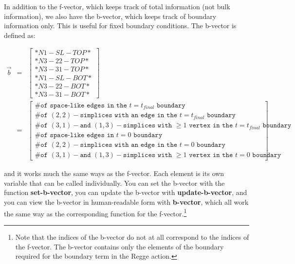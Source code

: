 \message{ !name(programmers_guide.tex)}\documentclass[12pt]{article}
\begin{document}
In addition to the f-vector, which keeps track of total information
(not bulk information), we also have the b-vector, which keeps track
of boundary information only. This is useful for fixed boundary
conditions. The b-vector is defined as:
\begin{small}
\begin{eqnarray}
  \vec{b}&=&\left[\begin{array}{c}\texttt{*}N1-SL-TOP*\\
      \texttt{*}N3-22-TOP*\\\texttt{*}N3-31-TOP*\\
      \texttt{*}N1-SL-BOT* \\\texttt{*}N3-22-BOT*\\ 
      \texttt{*}N3-31-BOT*\end{array}\right]\nonumber\\
  &=&\left[\begin{array}{c}\texttt{\# of space-like edges in the }t=t_{final}\texttt{ boundary}\\
      \texttt{\# of }(2,2)-\texttt{simplices with an edge in the }t=t_{final}\texttt{ boundary}\\
      \texttt{\# of }(3,1)-\texttt{and }(1,3)-\texttt{simplices with }\geq 1\texttt{ vertex in the }t=t_{final}\texttt{ boundary}\\
      \texttt{\# of space-like edges in } t=0\texttt{ boundary}\\
      \texttt{\# of }(2,2)-\texttt{simplices with an edge in the }t=0\texttt{ boundary}\\
      \texttt{\# of }(3,1)-\texttt{and }(1,3)-\texttt{simplices with }\geq 1\texttt{ vertex in the }t=0\texttt{ boundary}\end{array}\right]\nonumber
\end{eqnarray}
\end{small}
and it works much the same ways as the f-vector. Each element is its
own variable that can be called individually. You can set the b-vector
with the function \textbf{set-b-vector}, you can update the b-vector
with \textbf{update-b-vector}, and you can view the b-vector in
human-readable form with \textbf{b-vector}, which all work the same
way as the corresponding function for the f-vector.\footnote{Note that the indices of the b-vector do
  not at all correspond to the indices of the f-vector. The b-vector
  contains only the elements of the boundary required for the boundary
  term in the Regge action.}
\end{document}
